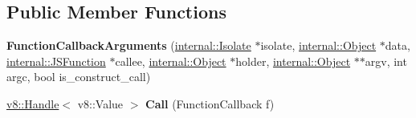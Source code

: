 \subsection*{Public Member Functions}
\begin{DoxyCompactItemize}
\item 
\hypertarget{classv8_1_1internal_1_1_function_callback_arguments_ab46e8883f5d8eceea8a4a7a45b42a2f4}{}{\bfseries Function\+Callback\+Arguments} (\hyperlink{classv8_1_1internal_1_1_isolate}{internal\+::\+Isolate} $\ast$isolate, \hyperlink{classv8_1_1internal_1_1_object}{internal\+::\+Object} $\ast$data, \hyperlink{classv8_1_1internal_1_1_j_s_function}{internal\+::\+J\+S\+Function} $\ast$callee, \hyperlink{classv8_1_1internal_1_1_object}{internal\+::\+Object} $\ast$holder, \hyperlink{classv8_1_1internal_1_1_object}{internal\+::\+Object} $\ast$$\ast$argv, int argc, bool is\+\_\+construct\+\_\+call)\label{classv8_1_1internal_1_1_function_callback_arguments_ab46e8883f5d8eceea8a4a7a45b42a2f4}

\item 
\hypertarget{classv8_1_1internal_1_1_function_callback_arguments_ac0601d8330f2d81ffba8ec2cefa293e7}{}\hyperlink{classv8_1_1_handle}{v8\+::\+Handle}$<$ v8\+::\+Value $>$ {\bfseries Call} (Function\+Callback f)\label{classv8_1_1internal_1_1_function_callback_arguments_ac0601d8330f2d81ffba8ec2cefa293e7}

\end{DoxyCompactItemize}
